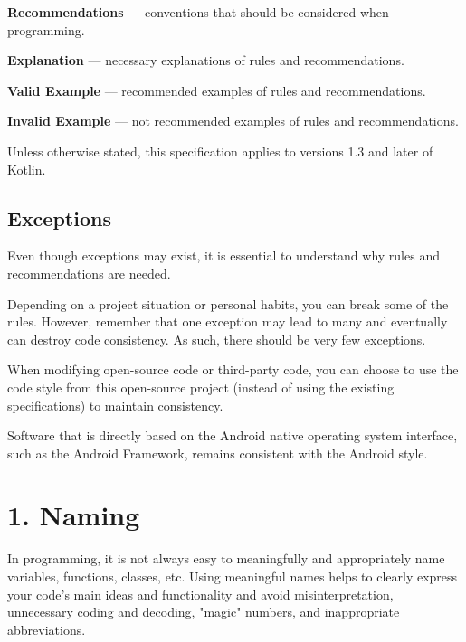 \textbf{Recommendations} — conventions that should be considered when programming.



\textbf{Explanation} — necessary explanations of rules and recommendations.



\textbf{Valid Example} — recommended examples of rules and recommendations.



\textbf{Invalid Example} — not recommended examples of rules and recommendations.



Unless otherwise stated, this specification applies to versions 1.3 and later of Kotlin.



\subsection*{\textbf{Exceptions}}




Even though exceptions may exist, it is essential to understand why rules and recommendations are needed.

Depending on a project situation or personal habits, you can break some of the rules. However, remember that one exception may lead to many and eventually can destroy code consistency. As such, there should be very few exceptions.

When modifying open-source code or third-party code, you can choose to use the code style from this open-source project (instead of using the existing specifications) to maintain consistency.

Software that is directly based on the Android native operating system interface, such as the Android Framework, remains consistent with the Android style.

\section*{\textbf{1. Naming}}

\label{sec:1.}

In programming, it is not always easy to meaningfully and appropriately name variables, functions, classes, etc. Using meaningful names helps to clearly express your code's main ideas and functionality and avoid misinterpretation, unnecessary coding and decoding, "magic" numbers, and inappropriate abbreviations.



